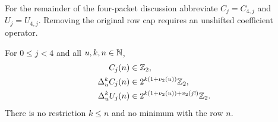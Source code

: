 For the remainder of the four-packet discussion abbreviate
$C_j=C_{4,j}$ and $U_j=U_{4,j}$.  Removing the original row cap requires
an unshifted coefficient operator.

\begin{theorem}\label{thm:arith-dyadic-differences}
For $0\le j<4$ and all $u,k,n\in\mathbb N$,
\begin{align}
 C_j(n)&\in\mathbb Z_2,\\
 \Delta_u^kC_j(n)&\in 2^{k(1+\nu_2(u))}\mathbb Z_2,\label{eq:arith-allrow-c}\\
 \Delta_u^kU_j(n)&\in
 2^{k(1+\nu_2(u))+v_2(j!)}\mathbb Z_2.\label{eq:arith-allrow-u}
\end{align}
There is no restriction $k\le n$ and no minimum with the row $n$.
\end{theorem}


